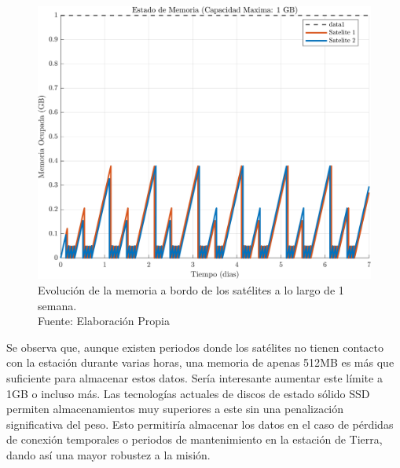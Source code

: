 \begin{figure}[H]
    \centering
    \includegraphics[width=1\linewidth]{7.Segmento_Tierra/memoria.jpg}
    \caption{Evolución de la memoria a bordo de los satélites a lo largo de 1 semana.\\ Fuente: Elaboración Propia}
\end{figure}

Se observa que, aunque existen periodos donde los satélites no tienen contacto con la estación durante varias horas, una memoria de apenas 512MB es más que suficiente para almacenar estos datos. Sería interesante aumentar este límite a 1GB o incluso más. Las tecnologías actuales de discos de estado sólido SSD permiten almacenamientos muy superiores a este sin una penalización significativa del peso. Esto permitiría almacenar los datos en el caso de pérdidas de conexión temporales o periodos de mantenimiento en la estación de Tierra, dando así una mayor robustez a la misión.
